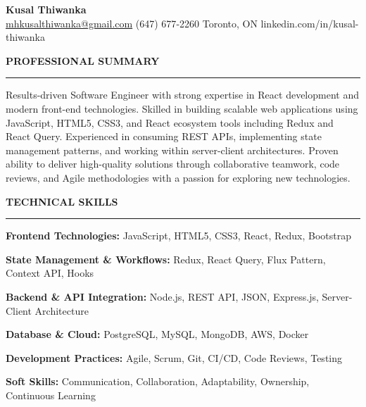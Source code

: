 \documentclass[10pt,letterpaper]{article}
\begin{document}
\begin{center}
{\LARGE\textbf{Kusal Thiwanka}}\\[3pt]
\href{mailto:mhkusalthiwanka@gmail.com}{mhkusalthiwanka@gmail.com}\hspace{2em}%
(647) 677{-}2260\hspace{2em}%
Toronto, ON\hspace{2em}
linkedin.com/in/kusal-thiwanka
\end{center}

\vspace{6pt}

\textbf{PROFESSIONAL SUMMARY}\\[-8pt]
\noindent\rule{\textwidth}{1pt}

\vspace{-2pt}

Results-driven Software Engineer with strong expertise in React development and modern front-end technologies. Skilled in building scalable web applications using JavaScript, HTML5, CSS3, and React ecosystem tools including Redux and React Query. Experienced in consuming REST APIs, implementing state management patterns, and working within server-client architectures. Proven ability to deliver high-quality solutions through collaborative teamwork, code reviews, and Agile methodologies with a passion for exploring new technologies.

\vspace{8pt}

\textbf{TECHNICAL SKILLS}\\[-8pt]
\noindent\rule{\textwidth}{1pt}

\vspace{-2pt}

\textbf{Frontend Technologies:} JavaScript, HTML5, CSS3, React, Redux, Bootstrap

\textbf{State Management \& Workflows:} Redux, React Query, Flux Pattern, Context API, Hooks

\textbf{Backend \& API Integration:} Node.js, REST API, JSON, Express.js, Server-Client Architecture

\textbf{Database \& Cloud:} PostgreSQL, MySQL, MongoDB, AWS, Docker

\textbf{Development Practices:} Agile, Scrum, Git, CI/CD, Code Reviews, Testing

\textbf{Soft Skills:} Communication, Collaboration, Adaptability, Ownership, Continuous Learning

\vspace{8pt}
\end{document}
